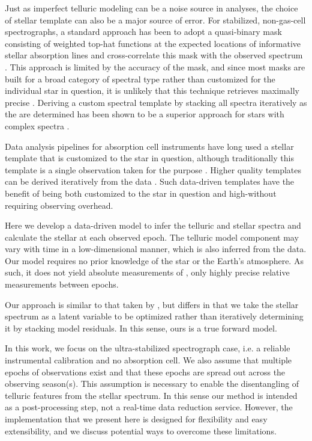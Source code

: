 \documentclass[modern]{aastex62}
\begin{document}
Just as imperfect telluric modeling can be a noise source in \EPRV analyses, the choice of stellar template can also be a major source of error.
For stabilized, non-gas-cell \RV spectrographs, a standard approach has been to adopt a quasi-binary mask consisting of weighted top-hat functions at the expected locations of informative stellar absorption lines and cross-correlate this mask with the observed spectrum \citep[e.g.][]{Baranne1979, Pepe2002}.
This approach is limited by the accuracy of the mask, and since most masks are built for a broad category of spectral type rather than customized for the individual star in question, it is unlikely that this technique retrieves maximally precise \RVs.
Deriving a custom spectral template by stacking all spectra iteratively as the \RVs are determined has been shown to be a superior approach for stars with complex spectra \citep{AngladaEscude2012}.

Data analysis pipelines for absorption cell instruments have long used a stellar template that is customized to the star in question, although traditionally this template is a single observation taken for the purpose \citep[e.g.][]{Butler1996}.
Higher quality templates can be derived iteratively from the data \citep{Sato2002, Gao2016}.
Such data-driven templates have the benefit of being both customized to the star in question and high-\SNR without requiring observing overhead.


Here we develop a data-driven model to infer the telluric and stellar spectra and calculate the stellar \RV at each observed epoch.
The telluric model component may vary with time in a low-dimensional manner, which is also inferred from the data.
Our model requires no prior knowledge of the star or the Earth's atmosphere.
As such, it does not yield absolute measurements of \RVs, only highly precise relative measurements between epochs.

Our approach is similar to that taken by \citet{Gao2016}, but differs in that we take the stellar spectrum as a latent variable to be optimized rather than iteratively determining it by stacking model residuals.
In this sense, ours is a true forward model.

In this work, we focus on the ultra-stabilized spectrograph case, i.e. a reliable instrumental calibration and no absorption cell.
We also assume that multiple epochs of observations exist and that these epochs are spread out across the observing season(s).
This assumption is necessary to enable the disentangling of telluric features from the stellar spectrum.
In this sense our method is intended as a post-processing step, not a real-time data reduction service.
However, the implementation that we present here is designed for flexibility and easy extensibility, and we discuss potential ways to overcome these limitations.
\end{document}
